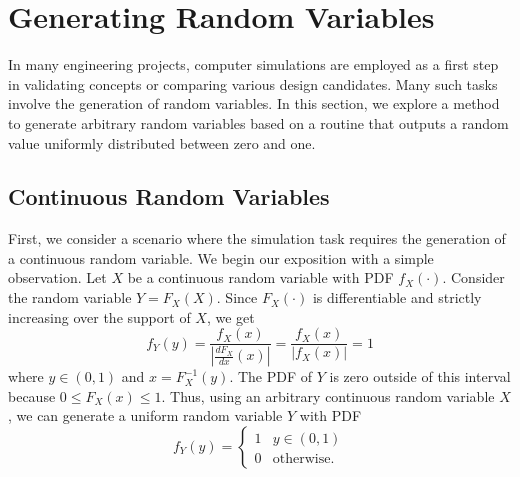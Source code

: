 \section{Generating Random Variables}

In many engineering projects, computer simulations are employed as a first step in validating concepts or comparing various design candidates.
Many such tasks involve the generation of random variables.
In this section, we explore a method to generate arbitrary random variables based on a routine that outputs a random value uniformly distributed between zero and one.

\subsection{Continuous Random Variables}

First, we consider a scenario where the simulation task requires the generation of a continuous random variable.
We begin our exposition with a simple observation.
Let $X$ be a continuous random variable with PDF $f_X (\cdot)$.
Consider the random variable $Y = F_X(X)$.
Since $F_X (\cdot)$ is differentiable and strictly increasing over the support of $X$, we get
\begin{equation*}
f_Y (y) = \frac{f_X (x)}{\left| \frac{d F_X}{dx} (x) \right|}
= \frac{f_X (x)}{| f_X (x) |} = 1
\end{equation*}
where $y \in (0, 1)$ and $x = F_X^{-1} (y)$.
The PDF of $Y$ is zero outside of this interval because $0 \leq F_X (x) \leq 1$.
Thus, using an arbitrary continuous random variable $X$, we can generate a uniform random variable $Y$ with PDF
\begin{equation*}
f_Y(y) = \begin{cases} 1 & y \in (0,1) \\
0 & \text{otherwise} . \end{cases}
\end{equation*}

